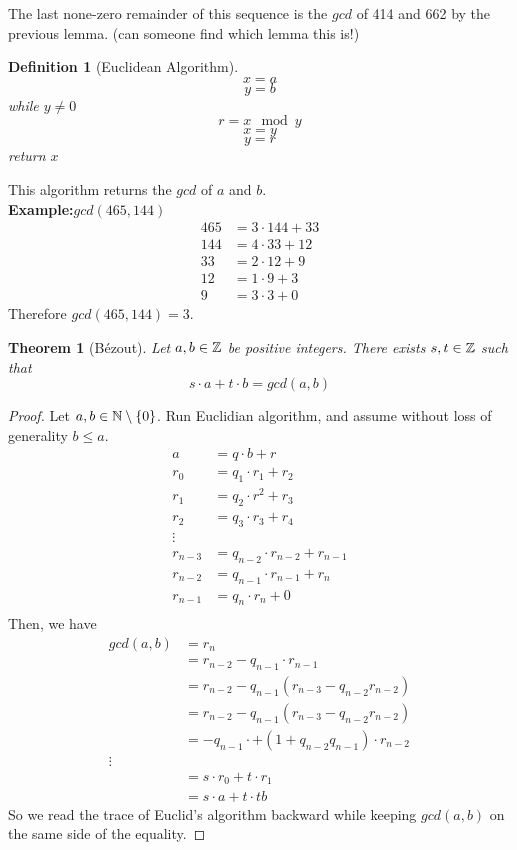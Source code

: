 \documentclass[openany]{report}
\newtheorem{theorem}{Theorem}[section]
\newtheorem{definition}{Definition}[section]
\begin{document}
The last none-zero remainder of this sequence is the $gcd$ of 414 and 662 by the previous lemma. (can someone find which lemma this is!)
\begin{definition}[Euclidean Algorithm]\label{definition6.0.1}
    $$x = a$$
    $$y = b$$
    while $y \neq 0$
    $$r = x \mod y$$
    $$x = y$$
    $$y = r$$
    return $x$
\end{definition}
This algorithm returns the $gcd$ of $a$ and $b$.\\[3ex]
\textbf{Example:}$gcd(465,144)$
\begin{align*}
    465 &= 3 \cdot 144 + 33\\
    144 &= 4 \cdot 33 + 12\\
    33 &= 2 \cdot 12  + 9\\
    12 &= 1 \cdot 9 + 3 \\
    9 &= 3 \cdot 3 + 0
\end{align*}
Therefore $gcd(465,144) = 3$. 
\begin{center}
\end{center}
\begin{theorem}[B\'ezout]\label{theorem6.0.1}
    Let $a,b \in \mathbb{Z}$ be positive integers. There exists $s,t \in \mathbb{Z}$ such that 
    $$s \cdot a + t \cdot b = gcd(a,b)$$
\end{theorem}
\begin{proof}
    Let $a,b \in \mathbb{N} \setminus \{0\}$. Run Euclidian algorithm, and assume without loss of generality $b \leq a$.
    \begin{align*}
        a &= q \cdot b + r\\
        r_0 &= q_1 \cdot r_1 + r_2\\
        r_1 &= q_2 \cdot r^2 + r_3\\
        r_2 &= q_3 \cdot r_3 + r_4\\
        \vdots \\
        r_{n-3} &= q_{n-2} \cdot r_{n-2} + r_{n-1}\\
        r_{n-2} &= q_{n-1} \cdot r_{n-1} + r_{n}\\
        r_{n-1} &= q_{n} \cdot r_{n} + 0\\
    \end{align*}
    Then, we have 
    \begin{align*}
        gcd(a,b) &= r_n\\
        &= r_{n-2} - q_{n-1} \cdot r_{n-1}\\
        &= r_{n-2} - q_{n-1}(r_{n-3} - q_{n-2}r_{n-2})\\
        &= r_{n-2} - q_{n-1}(r_{n-3} - q_{n-2}r_{n-2})\\
        &= - q_{n-1}\cdot + (1 + q_{n-2}q_{n-1})\cdot r_{n-2}\\
        \vdots \\
        &= s \cdot r_0 + t \cdot r_1\\
        &= s \cdot a + t \cdot tb
    \end{align*}
    So we read the trace of Euclid's algorithm backward while keeping $gcd(a,b)$ on the same side of the equality.
\end{proof}
\end{document}
